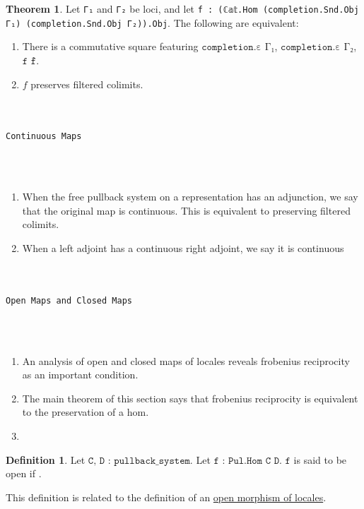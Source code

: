 \documentclass{book}
\theoremstyle{definition}
\newtheorem{definition}{Definition}
\newtheorem{theorem}{Theorem}
\renewcommand{\chapter}[1]{
\newpage
{
\Huge 
\begin{center}
\ \\
\ \\
\thispagestyle{empty}
\texttt{#1}
\end{center}}
\ \\
\ \\
}
\begin{document}
\begin{theorem}
Let \texttt{Γ₁} and \texttt{Γ₂} be loci, and let \texttt{f : (ℂ𝕒𝕥.Hom (completion.Snd.Obj Γ₁) (completion.Snd.Obj Γ₂)).Obj}. The following are equivalent:
\begin{enumerate}
\item There is a commutative square featuring $\texttt{completion.ε Γ₁}$, $\texttt{completion.ε Γ₂}$, $\texttt{f}$ $\texttt{f̂}$.
\item $f$ preserves filtered colimits.
\end{enumerate}
\end{theorem}

\chapter{Continuous Maps}

\begin{enumerate}
\item When the free pullback system on a representation has an adjunction, we say that the original map is continuous. This is equivalent to preserving filtered colimits.
\item When a left adjoint has a continuous right adjoint, we say it is continuous
\end{enumerate}

\chapter{Open Maps and Closed Maps}

\begin{enumerate}
\item An analysis of open and closed maps of locales reveals frobenius reciprocity as an important condition.
\item The main theorem of this section says that frobenius reciprocity is equivalent to the preservation of a hom.
\item 
\end{enumerate}

\begin{definition}
Let $\texttt{C, D : pullback\_system}$. Let $\texttt{f : Pul.Hom C D}$. $\texttt{f}$ is said to be open if . 
\end{definition}



This definition is related to the definition of an \href{https://ncatlab.org/nlab/show/open+morphism}{open morphism of locales}.
\end{document}
